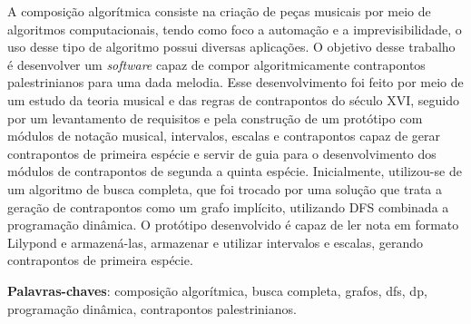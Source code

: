 \begin{resumo}
 A composição algorítmica consiste na criação de peças musicais por meio de algoritmos computacionais, tendo como foco a automação e a imprevisibilidade, o uso desse tipo de algoritmo possui diversas aplicações. O objetivo desse trabalho é desenvolver um \textit{software} capaz de compor algoritmicamente contrapontos palestrinianos para uma dada melodia. Esse desenvolvimento foi feito por meio de um estudo da teoria musical e das regras de contrapontos do século XVI, seguido por um levantamento de requisitos e pela construção de um protótipo com módulos de notação musical, intervalos, escalas e contrapontos capaz de gerar contrapontos de primeira espécie e servir de guia para o desenvolvimento dos módulos de contrapontos de segunda a quinta espécie. Inicialmente, utilizou-se de um algoritmo de busca completa, que foi trocado por uma solução que trata a geração de contrapontos como um grafo implícito, utilizando DFS combinada a programação dinâmica. O protótipo desenvolvido é capaz de ler nota em formato Lilypond e armazená-las, armazenar e utilizar intervalos e escalas, gerando contrapontos de primeira espécie.

 \vspace{\onelineskip}

 \noindent
 \textbf{Palavras-chaves}: composição algorítmica, busca completa, grafos, dfs, dp, programação dinâmica, contrapontos palestrinianos.
\end{resumo}
